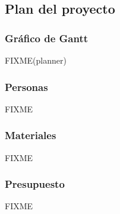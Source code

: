 
\subsection{Plan del proyecto}

\subsubsection{Gráfico de Gantt}

FIXME(planner)

\subsubsection{Personas}

FIXME

\subsubsection{Materiales}

FIXME

\subsubsection{Presupuesto}

FIXME
